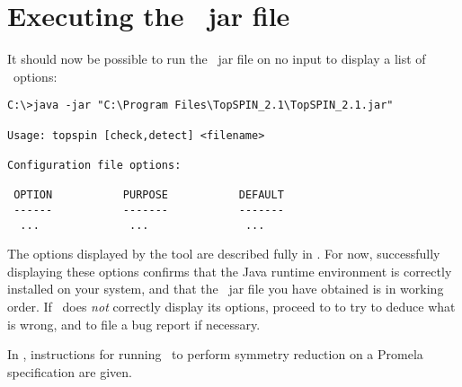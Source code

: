 \section{Executing the \protect\topspin\ jar file}
%
It should now be possible to run the \topspin\ jar file on no input
to display a list of \topspin\ options:
%
\begin{lstlisting}
C:\>java -jar "C:\Program Files\TopSPIN_2.1\TopSPIN_2.1.jar"

Usage: topspin [check,detect] <filename>

Configuration file options:

 OPTION           PURPOSE           DEFAULT
 ------           -------           -------
  ...              ...               ...
\end{lstlisting}
%
The options displayed by the tool are described fully in
.  For now, successfully displaying these options
confirms that the Java runtime environment is correctly installed on
your system, and that the \topspin\ jar file you have obtained is in
working order.  If \topspin\ does \emph{not} correctly display its
options, proceed to  to try to deduce what
is wrong, and to file a bug report if necessary.

In , instructions for running \topspin\ to perform
symmetry reduction on a Promela specification are given.
